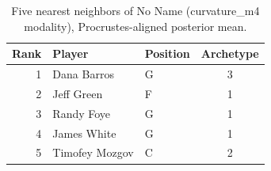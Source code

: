 \begin{table}[htbp]
  \centering\small
  \begin{tabular}{rllc}
    \toprule
    Rank & Player & Position & Archetype \\
    \midrule
    1 & Dana Barros & G & 3 \\
    2 & Jeff Green & F & 1 \\
    3 & Randy Foye & G & 1 \\
    4 & James White & G & 1 \\
    5 & Timofey Mozgov & C & 2 \\
    \bottomrule
  \end{tabular}
  \caption{Five nearest neighbors of No Name (curvature_m4 modality), Procrustes-aligned posterior mean.}
  \label{tab:No_Name_neighbors_curvature_m4}
\end{table}

